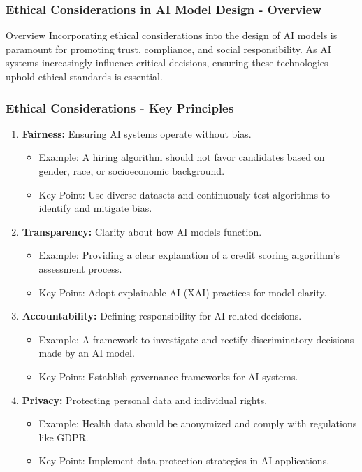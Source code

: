 \documentclass[aspectratio=169]{beamer}
\begin{document}
\begin{frame}[fragile]
    \frametitle{Ethical Considerations in AI Model Design - Overview}
    \begin{block}{Overview}
        Incorporating ethical considerations into the design of AI models is paramount for promoting trust, compliance, and social responsibility. As AI systems increasingly influence critical decisions, ensuring these technologies uphold ethical standards is essential.
    \end{block}
\end{frame}

\begin{frame}[fragile]
    \frametitle{Ethical Considerations - Key Principles}
    \begin{enumerate}
        \item \textbf{Fairness:} Ensuring AI systems operate without bias.
        \begin{itemize}
            \item Example: A hiring algorithm should not favor candidates based on gender, race, or socioeconomic background.
            \item Key Point: Use diverse datasets and continuously test algorithms to identify and mitigate bias.
        \end{itemize}
        
        \item \textbf{Transparency:} Clarity about how AI models function.
        \begin{itemize}
            \item Example: Providing a clear explanation of a credit scoring algorithm's assessment process.
            \item Key Point: Adopt explainable AI (XAI) practices for model clarity.
        \end{itemize}
        
        \item \textbf{Accountability:} Defining responsibility for AI-related decisions.
        \begin{itemize}
            \item Example: A framework to investigate and rectify discriminatory decisions made by an AI model.
            \item Key Point: Establish governance frameworks for AI systems.
        \end{itemize}
        
        \item \textbf{Privacy:} Protecting personal data and individual rights.
        \begin{itemize}
            \item Example: Health data should be anonymized and comply with regulations like GDPR.
            \item Key Point: Implement data protection strategies in AI applications.
        \end{itemize}
    \end{enumerate}
\end{frame}
\end{document}
